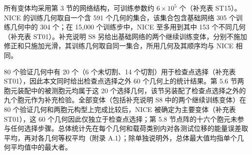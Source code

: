 \documentclass[preprint,12pt,authoryear]{elsarticle}
\begin{document}
所有变体均采用第 3 节的网络结构，可训练参数约 \(6\times10^5\) 个（补充表 ST15）。NICE 的训练几何取自一个含 591 个几何的集合，该集合包含基础网络 305 个训练几何中的 304 个；在 15,000 个训练步中，NICE 至多用到其中 153 个不同几何（补充表 ST01）。补充说明 S8 另给出基础网络的两个继续训练变体，分别不施加修正和只施加光滑，其训练几何取自同一集合，所用几何及其顺序均与 NICE 相同。

80 个验证几何中有 20 个（6 个未切割、14 个切割）用于检查点选择（补充表 ST01），因此本文同时给出检查点选择之外 60 个几何上的统计结果。第 5.6 节两胞元装配中的被测胞元均属于这 20 个选择几何，该节另装配了检查点选择之外的九个胞元作为补充检验。全部变体（包括补充说明 S8 中的两个继续训练变体）在 80 个验证几何和两胞元构型上完成比较后，NICE 被确定为主要变体（补充表 ST01），这 60 个几何因此仅独立于检查点选择；第 5.8 节点阵的十六个胞元未参与任何选择步骤。总体统计先在每个几何和载荷类别内对各测试位移的能量误差取平均，再对各几何等权平均（附录 A.1）；除单独说明外，总体最大值均指单个几何平均值中的最大者。
\end{document}
